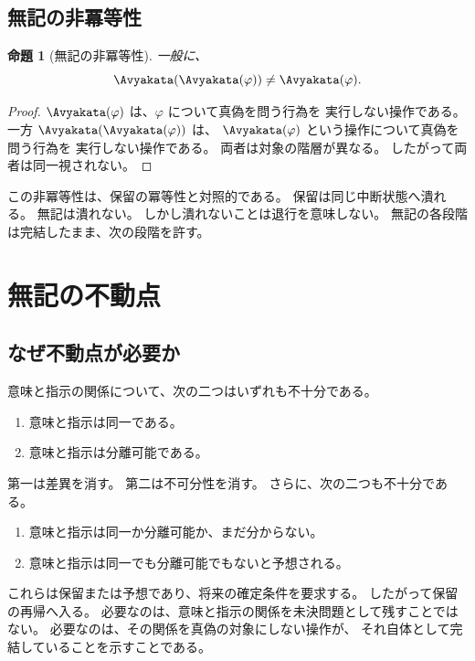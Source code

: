 \documentclass[11pt,a4paper,ja=standard,lualatex]{article}
\newtheorem{proposition}{命題}
\begin{document}
\subsection{無記の非冪等性}

\begin{proposition}[無記の非冪等性]
一般に、
\begin{equation}
\Avyakata(\Avyakata(\varphi))\neq\Avyakata(\varphi).
\end{equation}
\end{proposition}

\begin{proof}
$\Avyakata(\varphi)$ は、$\varphi$ について真偽を問う行為を
実行しない操作である。
一方 $\Avyakata(\Avyakata(\varphi))$ は、
$\Avyakata(\varphi)$ という操作について真偽を問う行為を
実行しない操作である。
両者は対象の階層が異なる。
したがって両者は同一視されない。
\end{proof}

この非冪等性は、保留の冪等性と対照的である。
保留は同じ中断状態へ潰れる。
無記は潰れない。
しかし潰れないことは退行を意味しない。
無記の各段階は完結したまま、次の段階を許す。

\section{無記の不動点}

\subsection{なぜ不動点が必要か}

意味と指示の関係について、次の二つはいずれも不十分である。

\begin{enumerate}
\item 意味と指示は同一である。
\item 意味と指示は分離可能である。
\end{enumerate}

第一は差異を消す。
第二は不可分性を消す。
さらに、次の二つも不十分である。

\begin{enumerate}
\item 意味と指示は同一か分離可能か、まだ分からない。
\item 意味と指示は同一でも分離可能でもないと予想される。
\end{enumerate}

これらは保留または予想であり、将来の確定条件を要求する。
したがって保留の再帰へ入る。
必要なのは、意味と指示の関係を未決問題として残すことではない。
必要なのは、その関係を真偽の対象にしない操作が、
それ自体として完結していることを示すことである。
\end{document}
